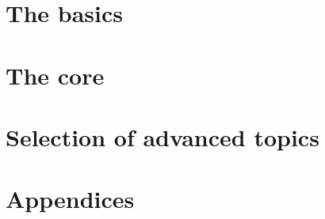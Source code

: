 \documentclass[10pt,a4paper,footinclude=true,headinclude=true]{scrbook}
\theoremstyle{classicdef}
\theoremstyle{remark}
\begin{document}
\pagestyle{plain}



\pagestyle{scrheadings}


\cleardoublepage
\cleardoublepage
\cleardoublepage
\mainmatter
\cleardoublepage
{}
\part{The basics}




\cleardoublepage
\part{The core}





\cleardoublepage
\part{Selection of advanced topics}






\cleardoublepage
\part{Appendices}
\appendix





\end{document}
